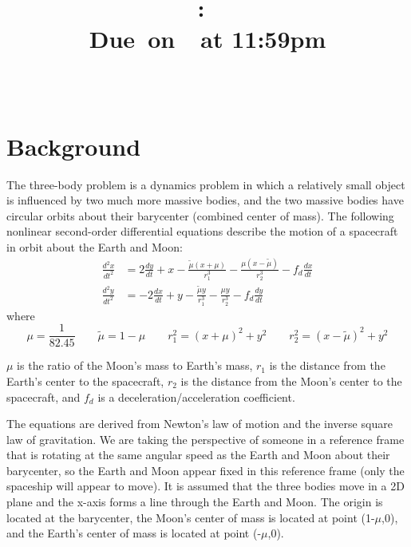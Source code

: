 \documentclass{article}
\title{
    \vspace{2in}
    \textmd{\textbf{\hmwkClass:\ \hmwkTitle}}\\
    \normalsize\vspace{0.1in}\small{Due\ on\ \hmwkDueDate\ at 11:59pm}\\
    \vspace{0.1in}\large{\textit{\hmwkClassInstructor\ \hmwkClassTime}}
    \vspace{3in}
}
\author{\hmwkAuthorName}
\date{}
\newcommand{\deriv}[2]{\frac{d#1}{d#2}}
\begin{document}
\color{white}

\maketitle

\pagebreak

\section{Background}

The \color{magenta} three-body problem \color{white} is a dynamics problem in which a relatively small object is influenced by two much more massive bodies, and the two massive bodies have circular orbits about their barycenter (combined center of mass). The following nonlinear second-order differential equations describe the motion of a spacecraft in orbit about the Earth and Moon:
\color{cyan}
\begin{align}
    \deriv{^2 x}{t^2} &= 2\deriv{y}{t} + x - \frac{\tilde{\mu} \left(x+\mu\right)}{r_1^3} - \frac{\mu \left(x-\tilde{\mu}\right)}{r_2^3} - f_d \deriv{x}{t}
    \label{eq:ODE1} \\
    \deriv{^2 y}{t^2} &= -2\deriv{x}{t} + y - \frac{\tilde{\mu}y}{r_1^3} - \frac{\mu y}{r_2^3} - f_d\deriv{y}{t} 
    \label{eq:ODE2}
\end{align}
\color{white} where
\color{orange}
\begin{equation*}
    \mu = \frac{1}{82.45} \qquad \tilde{\mu} = 1 - \mu \qquad r_1^2 = \left(x+\mu\right)^2 + y^2 \qquad r_2^2 = \left(x-\tilde{\mu}\right)^2 + y^2
\end{equation*} 

\color{white}

$\mu$ is the ratio of the Moon's mass to Earth's mass, $r_1$ is the distance from the Earth’s center to the
spacecraft, $r_2$ is the distance from the Moon’s center to the spacecraft, and $f_d$ is a deceleration/acceleration
coefficient.

\vspace{\baselineskip}

The equations are derived from Newton’s law of motion and the inverse square law of gravitation. We are taking the perspective of someone in a reference frame that is rotating at the same angular speed as the Earth and Moon about their barycenter, so the Earth and Moon appear fixed in this reference frame (only the spaceship will appear to move). It is assumed that the three bodies move in a 2D plane and the x-axis forms a line through the Earth and Moon. The origin is located at the barycenter, the Moon’s center of mass is located at point (1-$\mu$,0), and the Earth’s center of mass is located at point (-$\mu$,0). 
\end{document}
